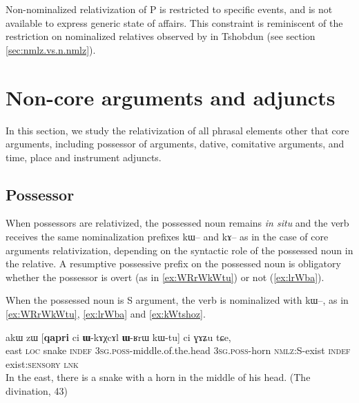 \documentclass[oldfontcommands,oneside,a4paper,11pt]{article}
\newcommand{\ipa}[1]{{\phon #1}} %
\begin{document}
Non-nominalized relativization of P is restricted to specific events, and is not available to express generic state of affairs. This constraint is reminiscent of the restriction on nominalized relatives observed by \citet[10]{jacksonlin07} in Tshobdun (see section \ref{sec:nmlz.vs.n.nmlz}).

  







  

\section{Non-core arguments and adjuncts} \label{sec:oblique}
In this section, we study the relativization of all phrasal elements other that core arguments, including possessor of arguments, dative, comitative arguments, and time, place and instrument adjuncts.


\subsection{Possessor} \label{sec:possessor}

When possessors are relativized, the possessed noun remains \textit{in situ} and the verb receives the same nominalization prefixes   \ipa{kɯ}-- and \ipa{kɤ}-- as in the case of core arguments relativization, depending on the syntactic role of the possessed noun in the relative. A resumptive possessive prefix on the possessed noun is obligatory whether the possessor is overt (as in \ref{ex:WRrWkWtu}) or not (\ref{ex:lrWba}).

When the possessed noun is S argument, the verb is nominalized with \ipa{kɯ}--, as in \ref{ex:WRrWkWtu}, \ref{ex:lrWba} and \ref{ex:kWtshoz}.

      \begin{exe}
   \ex \label{ex:WRrWkWtu}
 \gll 
\ipa{akɯ}   	\ipa{zɯ}   	[\textbf{\ipa{qapri} }  	\ipa{ci}   	\ipa{\textbf{ɯ}-kɤχcɤl}   	\ipa{\textbf{ɯ}-ʁrɯ}   	\ipa{kɯ-tu}]   	\ipa{ci}   	\ipa{ɣɤʑu}   	\ipa{tɕe,}   \\
east \textsc{loc} snake \textsc{indef} \textsc{3sg.poss}-middle.of.the.head  \textsc{3sg.poss}-horn \textsc{nmlz:S}-exist \textsc{indef} exist:\textsc{sensory}  \textsc{lnk} \\
\glt In the east, there is a snake with a horn in the middle of his head.  (The divination, 43)
\end{exe}
 
\end{document}

